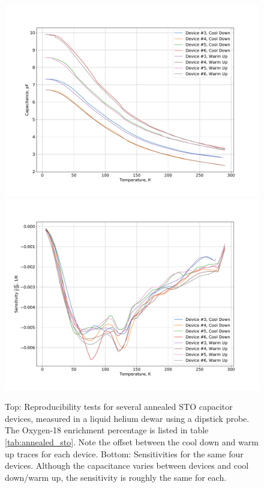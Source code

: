 \documentclass{thesis-umich}
\begin{document}
\begin{figure} \caption[Annealed STO Thermometer Reproducability Tests]{Top: Reproducibility tests for several annealed STO
	capacitor devices, measured in a liquid helium dewar using a dipstick
	probe. The Oxygen-18 enrichment percentage is listed in table \ref{tab:annealed_sto}. Note the
offset between the cool down and warm up traces for each device. Bottom:
Sensitivities for the same four devices. Although the capacitance varies
between devices and cool down/warm up, the sensitivity is roughly the same for
each.} 
\label{fig:annealed_sto_repro}
\centering
\includegraphics[width=0.85\columnwidth]{figures/annealed_sto_c_vs_t.pdf}
\includegraphics[width=0.85\columnwidth]{figures/annealed_sto_sens_vs_t.pdf}
\end{figure}
\end{document}
